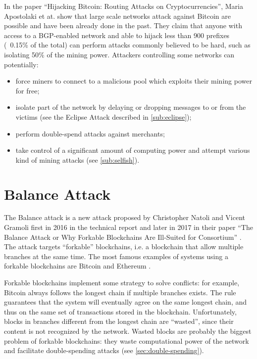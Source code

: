 \bigskip
In the paper ``Hijacking Bitcoin: Routing Attacks on Cryptocurrencies'', Maria Apostolaki et at. show that large scale networks attack against Bitcoin are possible and have been already done in the past.
They claim that anyone with access to a BGP-enabled network and able to hijack less than \num{900} prefixes (~\num{0.15}\% of the total) can perform attacks commonly believed to be hard, such as isolating \num{50}\% of the mining power.
Attackers controlling some networks can potentially:
\begin{itemize}
	\item force miners to connect to a malicious pool which exploits their mining power for free;
	\item isolate part of the network by delaying or dropping messages to or from the victims (see the Eclipse Attack described in \cref{sub:eclipse});
	\item perform double-spend attacks against merchants;
	\item take control of a significant amount of computing power and attempt various kind of mining attacks (see \cref{sub:selfish}).
\end{itemize}


\section{Balance Attack}
The Balance attack is a new attack proposed by Christopher Natoli and Vicent Gramoli first in \num{2016} in the technical report \cite{balance_attack_report_2016} and later in \num{2017} in their paper ``The Balance Attack or Why Forkable Blockchains Are Ill-Suited for Consortium'' \cite{balance_attack_2017}.
The attack targets ``forkable'' blockchains, i.e. a blockchain that allow multiple branches at the same time.
The most famous examples of systems using a forkable blockchains are Bitcoin \cite{bitcoin_2009} and Ethereum \cite{ethereum_2014}.

\bigskip
Forkable blockchains implement some strategy to solve conflicts:
for example, Bitcoin always follows the longest chain if multiple branches exists.
The rule guarantees that the system will eventually agree on the same longest chain, and thus on the same set of transactions stored in the blockchain.
Unfortunately, blocks in branches different from the longest chain are ``wasted'', since their content is not recognized by the network.
Wasted blocks are probably the biggest problem of forkable blockchains:
they waste computational power of the network and facilitate double-spending attacks \cite{double_spending_fast_analysis_2014} (see \cref{sec:double-spending}).

